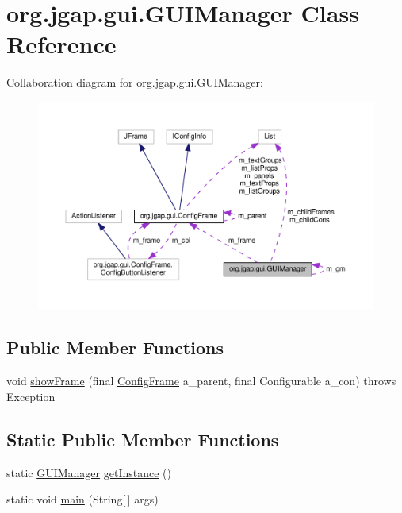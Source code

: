 \hypertarget{classorg_1_1jgap_1_1gui_1_1_g_u_i_manager}{\section{org.\-jgap.\-gui.\-G\-U\-I\-Manager Class Reference}
\label{classorg_1_1jgap_1_1gui_1_1_g_u_i_manager}
}


Collaboration diagram for org.\-jgap.\-gui.\-G\-U\-I\-Manager\-:
\nopagebreak
\begin{figure}[H]
\begin{center}
\leavevmode
\includegraphics[width=350pt]{classorg_1_1jgap_1_1gui_1_1_g_u_i_manager__coll__graph}
\end{center}
\end{figure}
\subsection*{Public Member Functions}
\begin{DoxyCompactItemize}
\item 
void \hyperlink{classorg_1_1jgap_1_1gui_1_1_g_u_i_manager_a9e65cab36763757e4e7a3ff587a88270}{show\-Frame} (final \hyperlink{classorg_1_1jgap_1_1gui_1_1_config_frame}{Config\-Frame} a\-\_\-parent, final Configurable a\-\_\-con)  throws Exception 
\end{DoxyCompactItemize}
\subsection*{Static Public Member Functions}
\begin{DoxyCompactItemize}
\item 
static \hyperlink{classorg_1_1jgap_1_1gui_1_1_g_u_i_manager}{G\-U\-I\-Manager} \hyperlink{classorg_1_1jgap_1_1gui_1_1_g_u_i_manager_a0e35146ce80b81c752cf38030cbcb68d}{get\-Instance} ()
\item 
static void \hyperlink{classorg_1_1jgap_1_1gui_1_1_g_u_i_manager_af0d87a9418dcf1b0ac3704413841d3fd}{main} (String\mbox{[}$\,$\mbox{]} args)
\end{DoxyCompactItemize}
